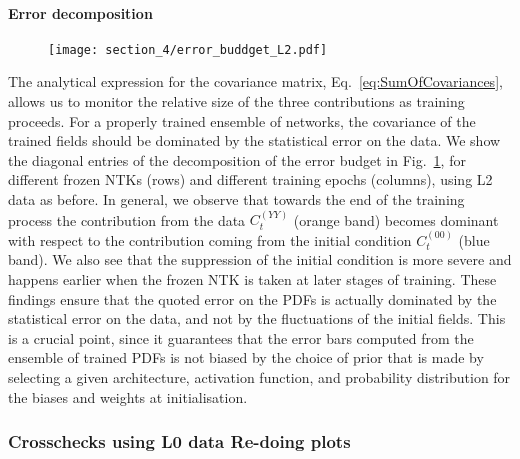 \paragraph{Error decomposition}
\begin{figure}[t!]
  \centering
  \texttt{[image: section\_4/error\_buddget\_L2.pdf]}
  \caption{}
  \label{fig:ErrorBudgetL2}
\end{figure}
The analytical expression for the covariance matrix,
Eq.~\eqref{eq:SumOfCovariances}, allows us to monitor the relative size of the
three contributions as training proceeds. For a properly trained ensemble of 
networks, the covariance of the trained fields should be
dominated by the statistical error on the data. We show the diagonal entries of
the decomposition of the error budget in Fig.~\ref{fig:ErrorBudgetL2}, for
different frozen NTKs (rows) and different training epochs (columns), using L2
data as before. In general, we observe that towards the end of the training 
process the
contribution from the data $C_t^{(YY)}$ (orange band) becomes dominant with
respect to the contribution coming from the initial condition $C_t^{(00)}$ (blue
band). We also see that the suppression of the initial condition is more severe
and happens earlier when the frozen NTK is taken at later stages of training.
These findings ensure that the quoted error on the PDFs is actually dominated by
the statistical error on the data, and not by the fluctuations of the initial
fields. This is a crucial point, since it guarantees that the error bars computed
from the ensemble of
trained PDFs is not biased by the choice of prior that is made by selecting a
given architecture, activation function, and probability distribution for the
biases and weights at initialisation.

\subsubsection{Crosschecks using L0 data \ac{Re-doing plots}}
\label{sec:AnalyticalChecks}

